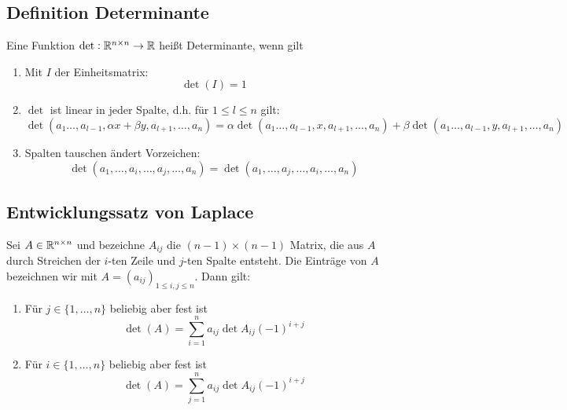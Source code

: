 \subsection{Definition Determinante}
Eine Funktion $\det: \mathbb{R}^{n \times n} \to \mathbb{R}$ heißt Determinante, wenn gilt
\begin{enumerate}[label= (\alph*)]
	\item Mit $I$ der Einheitsmatrix:
		\begin{equation*}
			\det(I) = 1
		\end{equation*}
	\item $\det$ ist linear in jeder Spalte, d.h. für $1\leq l \leq n$ gilt:
		\begin{equation*}
			\det(a_1 \ldots, a_{l-1}, \alpha x + \beta y, a_{l+1}, \ldots, a_n) =
			\alpha \det(a_1 \ldots, a_{l-1}, x, a_{l+1}, \ldots, a_n) + 
			\beta \det(a_1 \ldots, a_{l-1}, y, a_{l+1}, \ldots, a_n)
		\end{equation*}
	\item Spalten tauschen ändert Vorzeichen:
		\begin{equation*}
			\det(a_1, \ldots, a_i, \ldots, a_j, \ldots, a_n) =
			\det(a_1, \ldots, a_j, \ldots, a_i, \ldots, a_n)
		\end{equation*}
\end{enumerate}

\subsection{Entwicklungssatz von Laplace}
Sei $A \in \mathbb{R}^{n \times n}$ und bezeichne $A_{ij}$ die $(n-1)\times(n-1)$ Matrix, die aus $A$ durch Streichen
der $i$-ten Zeile und $j$-ten Spalte entsteht. Die Einträge von $A$ bezeichnen wir mit $A = (a_{ij})_{1 \leq i,j \leq n}$. Dann gilt:
\begin{enumerate}[label= (\alph*)]
	\item Für $j \in \{1, \ldots, n \}$ beliebig aber fest ist
		\begin{equation*}
			\det(A) = \sum_{i=1}^n a_{ij} \det{A_{ij}} {(-1)}^{i+j}
		\end{equation*}
	\item Für $i \in \{1, \ldots, n \}$ beliebig aber fest ist
		\begin{equation*}
			\det(A) = \sum_{j=1}^n a_{ij} \det{A_{ij}} {(-1)}^{i+j}
		\end{equation*}
\end{enumerate}

